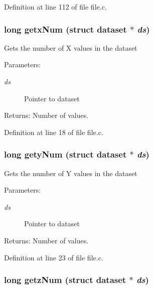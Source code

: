Definition at line 112 of file file.c.
\subsubsection{\setlength{\rightskip}{0pt plus 5cm}long getx\-Num (struct {\bf dataset} $\ast$ {\em ds})}\label{file_8h_a0}


Gets the number of X values in the dataset

\begin{Desc}
\item[Parameters:]
\begin{description}
\item[{\em ds}]Pointer to dataset \end{description}
\end{Desc}
\begin{Desc}
\item[Returns:]Number of values. \end{Desc}


Definition at line 18 of file file.c.
\subsubsection{\setlength{\rightskip}{0pt plus 5cm}long gety\-Num (struct {\bf dataset} $\ast$ {\em ds})}\label{file_8h_a1}


Gets the number of Y values in the dataset

\begin{Desc}
\item[Parameters:]
\begin{description}
\item[{\em ds}]Pointer to dataset \end{description}
\end{Desc}
\begin{Desc}
\item[Returns:]Number of values. \end{Desc}


Definition at line 23 of file file.c.
\subsubsection{\setlength{\rightskip}{0pt plus 5cm}long getz\-Num (struct {\bf dataset} $\ast$ {\em ds})}\label{file_8h_a2}


